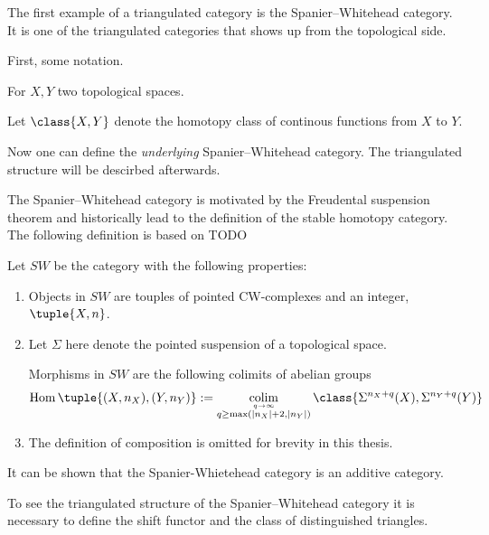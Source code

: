 The first example of a triangulated category is the Spanier--Whitehead category. It is one of the triangulated categories that shows up from the topological side.

First, some notation.
\begin{notation}
    For \( X, Y \) two topological spaces.

    Let \( \class{ X, Y } \) denote the homotopy class of continous functions from \( X \) to \( Y \).
\end{notation}

Now one can define the \emph{underlying} Spanier--Whitehead category. The triangulated structure will be descirbed afterwards.

The Spanier--Whitehead category is motivated by the Freudental suspension theorem and historically lead to the definition of the stable homotopy category. The following definition is based on TODO

\begin{definition}
    \label{def:sw-cat}
    Let \( SW \) be the category with the following properties:
    \begin{enumerate}
        \item {
            Objects in \( SW \) are touples of pointed CW-complexes and an integer, \( \tuple{X, n} \).
        }
        \item {
            Let \( \Sigma \) here denote the pointed suspension of a topological space.

            Morphisms in \( SW \) are the following colimits of abelian groups
            \[
                \Hom\tuple{ (X, n_X), (Y, n_Y) } := \colim_{\stackrel{q \to \infty}{q \geq \max(|n_X| + 2, |n_Y|)}} \class{ \Sigma^{n_X + q}(X), \Sigma^{n_Y + q}(Y) }
            \]
        }
        \item {
            The definition of composition is omitted for brevity in this thesis.
        }
    \end{enumerate}
\end{definition}

It can be shown that the Spanier-Whietehead category is an additive category.

To see the triangulated structure of the Spanier--Whitehead category it is necessary to define the shift functor and the class of distinguished triangles.

